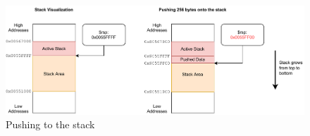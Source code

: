 \begin{figure}[htp!]
    \centering
    \includegraphics[width=\textwidth]{assets/figures/chapter2/stack.pdf}
    \caption{Pushing to the stack}
    \label{fig:stack}
\end{figure}
